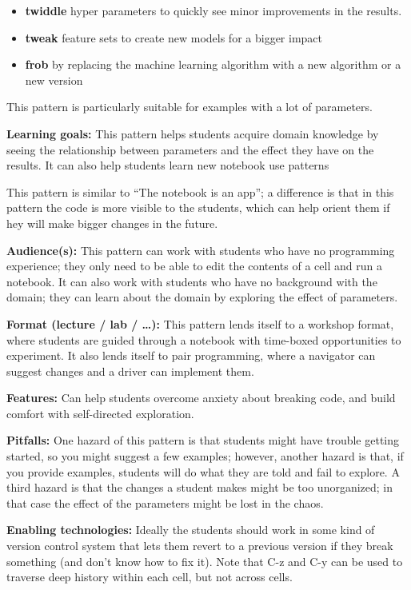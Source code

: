 \documentclass[]{book}
\providecommand{\tightlist}{%
  \setlength{\itemsep}{0pt}\setlength{\parskip}{0pt}}
\begin{document}
\begin{itemize}
\tightlist
\item
  \textbf{twiddle} hyper parameters to quickly see minor improvements in
  the results.
\item
  \textbf{tweak} feature sets to create new models for a bigger impact
\item
  \textbf{frob} by replacing the machine learning algorithm with a new
  algorithm or a new version
\end{itemize}

This pattern is particularly suitable for examples with a lot of
parameters.

\textbf{Learning goals:} This pattern helps students acquire domain
knowledge by seeing the relationship between parameters and the effect
they have on the results. It can also help students learn new notebook
use patterns

This pattern is similar to ``The notebook is an app''; a difference is
that in this pattern the code is more visible to the students, which can
help orient them if hey will make bigger changes in the future.

\textbf{Audience(s):} This pattern can work with students who have no
programming experience; they only need to be able to edit the contents
of a cell and run a notebook. It can also work with students who have no
background with the domain; they can learn about the domain by exploring
the effect of parameters.

\textbf{Format (lecture / lab / \ldots{}):} This pattern lends itself to
a workshop format, where students are guided through a notebook with
time-boxed opportunities to experiment. It also lends itself to pair
programming, where a navigator can suggest changes and a driver can
implement them.

\textbf{Features:} Can help students overcome anxiety about breaking
code, and build comfort with self-directed exploration.

\textbf{Pitfalls:} One hazard of this pattern is that students might
have trouble getting started, so you might suggest a few examples;
however, another hazard is that, if you provide examples, students will
do what they are told and fail to explore. A third hazard is that the
changes a student makes might be too unorganized; in that case the
effect of the parameters might be lost in the chaos.

\textbf{Enabling technologies:} Ideally the students should work in some
kind of version control system that lets them revert to a previous
version if they break something (and don't know how to fix it). Note
that C-z and C-y can be used to traverse deep history within each cell,
but not across cells.
\end{document}
